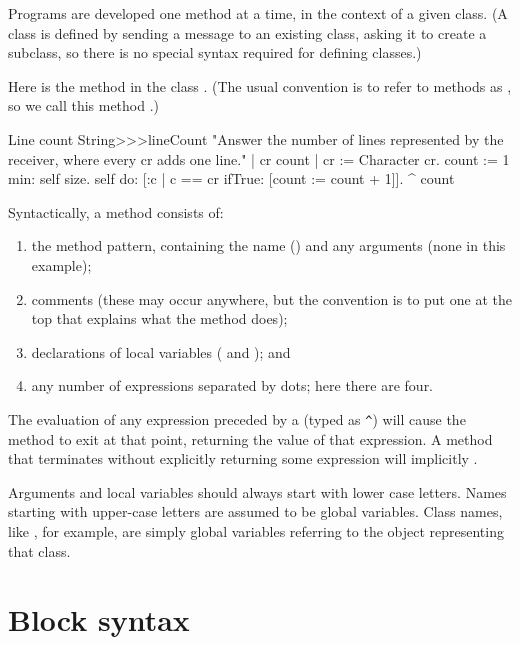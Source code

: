 \documentclass[a4paper,10pt,twoside]{book}
\begin{document}
Programs are developed one method at a time, in the context of a given class.
(A class is defined by sending a message to an existing class, asking it to create a subclass, so there is no special syntax required for defining classes.)

Here is the method  in the class .
(The usual convention is to refer to methods as , so we call this method .)

\begin{method}[lineCount]{Line count}
String>>>lineCount
   "Answer the number of lines represented by the receiver,
   where every cr adds one line."
   | cr count |
   cr := Character cr.
   count := 1 min: self size.
   self do:
      [:c | c == cr ifTrue: [count := count + 1]].
   ^ count
\end{method}

Syntactically, a method consists of:
\begin{enumerate}
  \item the method pattern, containing the name (\ie {}) and any arguments (none in this example);
  \item comments (these may occur anywhere, but the convention is to put one at the top that explains what the method does);
  \item declarations of local variables (\ie {} and ); and
  \item any number of expressions separated by dots; here there are four.
\end{enumerate}

The evaluation of any expression preceded by a \ct{^} (typed as \verb|^|) will cause the method to exit at that point, returning the value of that expression.
A method that terminates without explicitly returning some expression will implicitly  .

Arguments and local variables should always start with lower case letters.
Names starting with upper-case letters are assumed to be global variables.
Class names, like , for example, are simply global variables referring to the object representing that class.

\section{Block syntax}
\end{document}
